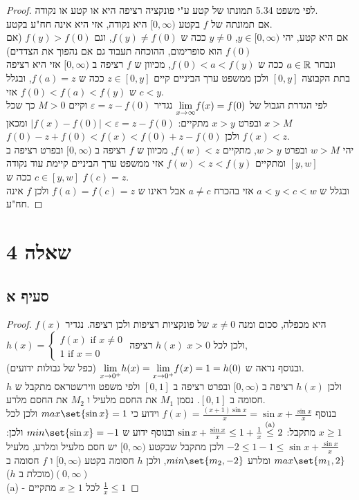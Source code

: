 \documentclass{article}
\DeclarePairedDelimiter\set\{\}
\begin{document}
	\begin{proof}
		לפי משפט 5.34 תמונתו של קטע ע"י פונקציה רציפה היא או קטע או נקודה. \\
		אם תמונתה של $f$ בקטע $[0, \infty)$ היא נקודה, אזי היא אינה חח"ע בקטע. \\
		אם היא קטע, יהי $y \in [0, \infty)$, $y \neq 0$ ככה ש $f(y) \neq f(0)$, וגם $f(y) > f(0)$ (אם $f(0)$ הוא סופרימום, ההוכחה תעבוד גם אם נהפוך את הצדדים) \\
		ונבחר $a \in \mathbb{R}$ ככה ש $f(0) < a < f(y)$, מכיוון ש $f$ רציפה ב $[0, \infty)$ אזי היא רציפה בתת הקבוצה $[0, y]$
		ולכן ממשפט ערך הביניים קיים $z \in [0, y]$ ככה ש $f(a) = z$, ובגלל ש $f(0) < f(a) < f(y)$ אזי $c < y$. \\
		לפי הגדרת הגבול של $\displaystyle{\lim_{x \to \infty}} f(x) = f(0)$ נגדיר $\varepsilon = z - f(0)$
		וקיים $M > 0$ כך שכל $x > M$ ובפרט $x > y$ מתקיים:
		$|f(x)-f(0)| < \varepsilon = z - f(0)$ ומכאן \\
		$f(0)- z + f(0) < f(x) < f(0) + z - f(0)$ ולכן $f(x) < z$. \\
		יהי $w > M$ ובפרט $w > y$, מתקיים $f(w) < z$, מכיוון ש $f$ רציפה ב $[0, \infty)$ ובפרט רציפה ב $[y, w]$
		ומתקיים $f(w) < z < f(y)$ אזי ממשפט ערך הביניים קיימת עוד נקודה $c \in [y, w]$ ככה ש $f(c) = z$. \\
		ובגלל ש $a < y < c < w$ אזי בהכרח $a \neq c$ אבל ראינו ש $f(a) = f(c) = z$ ולכן $f$ אינה חח"ע.
	\end{proof}

	\section*{שאלה 4}
	\subsection*{סעיף א}
	\begin{proof}
		$f(x)$ היא מכפלה, סכום ומנה $x \neq 0$ של פונקציות רציפות ולכן רציפה.
		נגדיר  \\
		$h(x) = \begin{cases}
			f(x) \text{ if } x \neq 0 \\
			1 \text{ if } x = 0
		\end{cases}$
		ולכן לכל $x > 0$ $h(x)$ רציפה, \\
		 ובנוסף נראה ש $\displaystyle{\lim_{x \to 0^+}}h(x) = \displaystyle{\lim_{x \to 0^+}}f(x) = 1 = h(0)$ (כפל של גבולות ידועים). \\
		 ולכן $h(x)$ רציפה ב $[0, \infty)$ ובפרט רציפה ב $[0,1]$ ולפי משפט ווירשטראס מתקבל ש $h$ חסומה ב $[0,1]$.
		 נסמן $M_1$ את החסם מלעיל ו $M_2$ את החסם מלרע. \\
		 בנוסף $f(x) = \frac{(x+1)\sin x}{x} = \sin x + \frac{\sin x}{x}$
		 וידוע כי $max\set{\sin x} = 1$ ולכן לכל $x \geq 1$ מתקבל:
		 $\sin x + \frac{\sin x}{x} \leq 1 + \frac{1}{x} \overset{\text{(a)}}\leq 2$
		 ובנוסף ידוע ש $min\set{\sin x} = -1$ ולכן:
		 $-2 \leq 1-1 \leq \sin x + \frac{\sin x}{x}$
		 ולכן מתקבל שבקטע $[0, \infty)$ יש חסם מלעיל ומלרע, מלעיל $max\set{m_1, 2}$ ומלרע $min\set{m_2, -2}$, ולכן $h$ חסומה בקטע $[0, \infty)$ ו $f$ חסומה ב $(0, \infty)$(מוכלת ב $h$) \\
		 (a) - לכל $x \geq 1$ מתקיים $\frac{1}{x} \leq 1$
	\end{proof}
\end{document}
